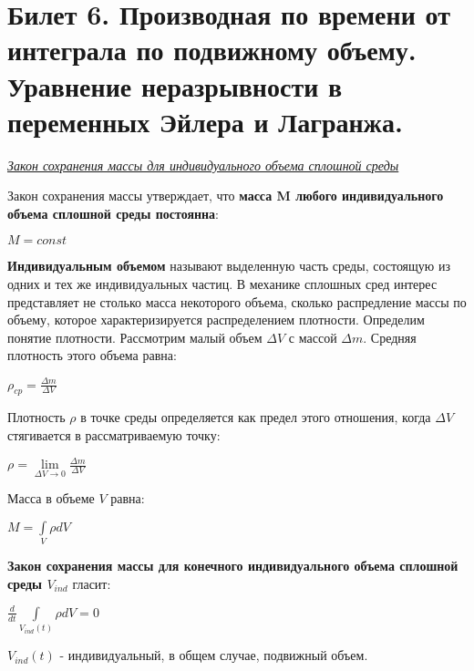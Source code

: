 \newpage
\section{Билет 6. Производная по времени от интеграла по подвижному объему. Уравнение неразрывности в переменных Эйлера и Лагранжа.}
\begin{center}
    \textit{\underline{Закон сохранения массы для индивидуального объема сплошной среды}}
\end{center}

Закон сохранения массы утверждает, что \textbf{масса M любого индивидуального объема сплошной среды постоянна}:
\begin{center}$
M = const
$\end{center}
\textbf{Индивидуальным объемом} называют выделенную часть среды, состоящую из одних и тех же индивидуальных частиц. В механике сплошных сред интерес представляет не столько масса некоторого объема, сколько распредление массы по объему, которое характеризируется распределением плотности. Определим понятие плотности. Рассмотрим малый объем $\Delta {V}$ с массой $\Delta m$. Средняя плотность этого объема равна:
\begin{center}$
\rho_{cp} = \frac{\Delta m}{\Delta V}
$\end{center}

Плотность $\rho$ в точке среды определяется как предел этого отношения, когда $\Delta V$ стягивается в рассматриваемую точку:
\begin{center}$
\rho = \lim\limits_{\Delta V \to 0} \frac{\Delta m}{\Delta V}
$\end{center}

Масса в объеме $V$ равна:
\begin{center}$
M = \int\limits_V \rho dV
$\end{center}

\textbf{Закон сохранения массы для конечного индивидуального объема сплошной среды $V_{ind}$} гласит:
\begin{center}$
\frac{d}{dt} \int\limits_{V_{ind}(t)} \rho dV = 0
$\end{center}

$V_{ind}(t)$ - индивидуальный, в общем случае, подвижный объем.

